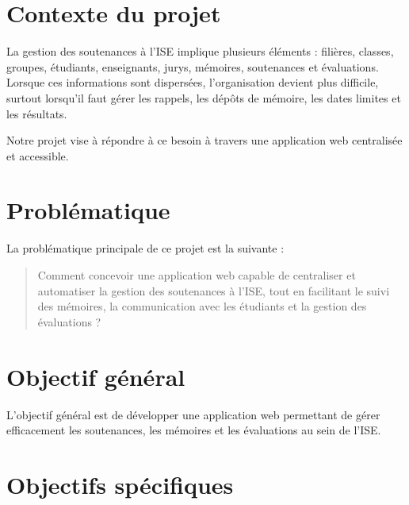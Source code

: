\documentclass[a4paper,12pt,oneside]{report}
\begin{document}
\section{Contexte du projet}

La gestion des soutenances à l'ISE implique plusieurs éléments : filières, classes, groupes, étudiants, enseignants, jurys, mémoires, soutenances et évaluations. Lorsque ces informations sont dispersées, l'organisation devient plus difficile, surtout lorsqu'il faut gérer les rappels, les dépôts de mémoire, les dates limites et les résultats.

Notre projet vise à répondre à ce besoin à travers une application web centralisée et accessible.

\section{Problématique}

La problématique principale de ce projet est la suivante :

\begin{quote}
Comment concevoir une application web capable de centraliser et automatiser la gestion des soutenances à l'ISE, tout en facilitant le suivi des mémoires, la communication avec les étudiants et la gestion des évaluations ?
\end{quote}

\section{Objectif général}

L'objectif général est de développer une application web permettant de gérer efficacement les soutenances, les mémoires et les évaluations au sein de l'ISE.

\section{Objectifs spécifiques}
\end{document}
